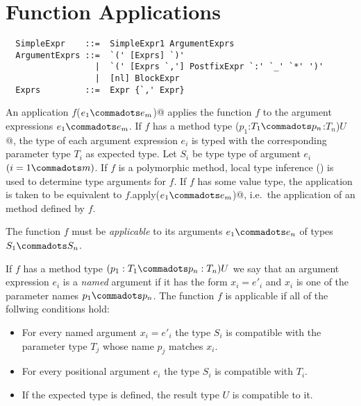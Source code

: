 \section{Function Applications}
\label{sec:apply}

\syntax\begin{lstlisting}
  SimpleExpr    ::=  SimpleExpr1 ArgumentExprs
  ArgumentExprs ::=  `(' [Exprs] `)'
                  |  `(' [Exprs `,'] PostfixExpr `:' `_' `*' ')'
                  |  [nl] BlockExpr
  Exprs         ::=  Expr {`,' Expr}
\end{lstlisting}

An application \lstinline@$f$($e_1 \commadots e_m$)@ applies the
function $f$ to the argument expressions $e_1 \commadots e_m$. If $f$
has a method type \lstinline@($p_1$:$T_1 \commadots p_n$:$T_n$)$U$@, the type of
each argument expression $e_i$ is typed with the
corresponding parameter type $T_i$ as expected type. Let $S_i$ be type
type of argument $e_i$ $(i = 1 \commadots m)$. If $f$ is a polymorphic method,
local type inference () is used to determine
type arguments for $f$. If $f$ has some value type, the application is taken to
be equivalent to \lstinline@$f$.apply($e_1 \commadots e_m$)@,
i.e.\ the application of an  method defined by $f$.

The function $f$ must be {\em applicable} to its arguments $e_1
\commadots e_n$ of types $S_1 \commadots S_n$.

If $f$ has a method type $(p_1:T_1 \commadots p_n:T_n)U$
we say that an argument expression $e_i$ is a {\em named} argument if
it has the form $x_i=e'_i$ and $x_i$ is one of the parameter names
$p_1 \commadots p_n$. The function $f$ is applicable if all of the follwing conditions
hold:

\begin{itemize}
\item For every named argument $x_i=e'_i$ the type $S_i$
  is compatible with the parameter type $T_j$ whose name $p_j$ matches $x_i$.
\item For every positional argument $e_i$ the type $S_i$
is compatible with $T_i$.
\item If the expected type is defined, the result type $U$ is
compatible to it.
\end{itemize}

